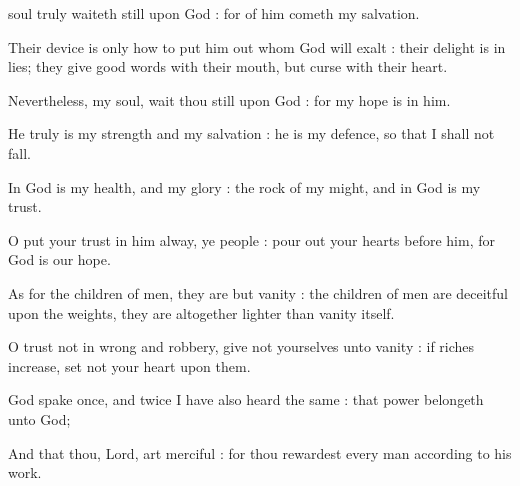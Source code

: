 

 soul truly waiteth still upon God : for of him cometh my salvation.\par
{}
Their device is only how to put him out whom God will exalt : their delight is in lies; they give good words with their mouth, but curse with their heart.\par
{}Nevertheless, my soul, wait thou still upon God : for my hope is in him.\par
{}He truly is my strength and my salvation : he is my defence, so that I shall not fall.\par
{}In God is my health, and my glory : the rock of my might, and in God is my trust.\par
{}O put your trust in him alway, ye people : pour out your hearts before him, for God is our hope.\par
{}As for the children of men, they are but vanity : the children of men are deceitful upon the weights, they are altogether lighter than vanity itself.\par
{}O trust not in wrong and robbery, give not yourselves unto vanity : if riches increase, set not your heart upon them.\par
{}God spake once, and twice I have also heard the same : that power belongeth unto God;\par
{}And that thou, Lord, art merciful : for thou rewardest every man according to his work.\par


